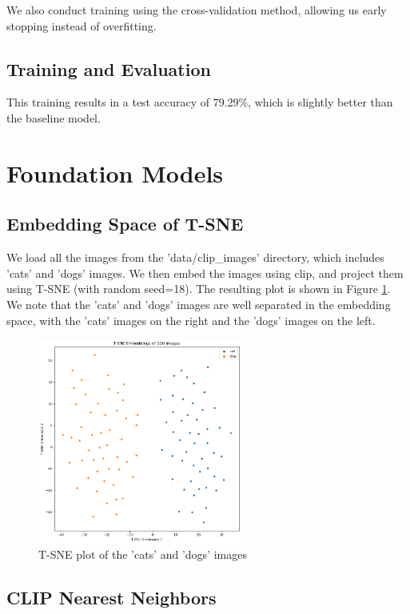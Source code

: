 \documentclass{article}
\begin{document}
We also conduct training using the cross-validation method, allowing us early stopping instead of overfitting.


\subsection{Training and Evaluation}
This training results in a test accuracy of 79.29\%, which is slightly better than the baseline model. 

\newpage

\section{Foundation Models}

\subsection{Embedding Space of T-SNE}
We load all the images from the 'data/clip\_images' directory, which includes 'cats' and 'dogs' images. We then embed the images using clip, and project them using T-SNE (with random seed=18). The resulting plot is shown in Figure \ref{fig:tsne_plot}. We note that the 'cats' and 'dogs' images are well separated in the embedding space, with the 'cats' images on the right and the 'dogs' images on the left.
\begin{figure}[h!]
    \centering
    \includegraphics[width=0.6\textwidth]{figs/3.1_emb.png}
    \caption{T-SNE plot of the 'cats' and 'dogs' images}
    \label{fig:tsne_plot}
\end{figure}

\subsection{CLIP Nearest Neighbors}
\end{document}
